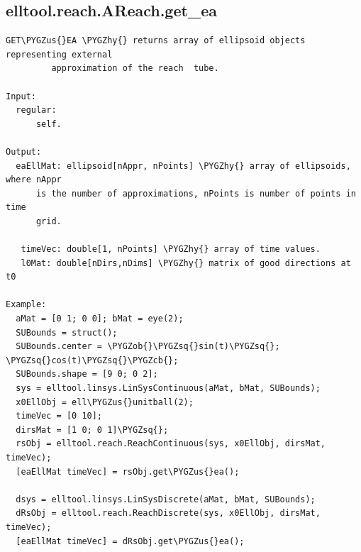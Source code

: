 \documentclass[letterpaper,10pt,english]{sphinxmanual}
\def\PYGZus{\char`\_}
\def\PYGZob{\char`\{}
\def\PYGZcb{\char`\}}
\def\PYGZhy{\char`\-}
\def\PYGZsq{\char`\'}
\begin{document}
\subsection{elltool.reach.AReach.get\_ea}
\label{chap_functions:elltool-reach-areach-get-ea}
\begin{Verbatim}[commandchars=\\\{\}]
GET\PYGZus{}EA \PYGZhy{} returns array of ellipsoid objects representing external
         approximation of the reach  tube.

Input:
  regular:
      self.

Output:
  eaEllMat: ellipsoid[nAppr, nPoints] \PYGZhy{} array of ellipsoids, where nAppr
      is the number of approximations, nPoints is number of points in time
      grid.

   timeVec: double[1, nPoints] \PYGZhy{} array of time values.
   l0Mat: double[nDirs,nDims] \PYGZhy{} matrix of good directions at t0

Example:
  aMat = [0 1; 0 0]; bMat = eye(2);
  SUBounds = struct();
  SUBounds.center = \PYGZob{}\PYGZsq{}sin(t)\PYGZsq{}; \PYGZsq{}cos(t)\PYGZsq{}\PYGZcb{};
  SUBounds.shape = [9 0; 0 2];
  sys = elltool.linsys.LinSysContinuous(aMat, bMat, SUBounds);
  x0EllObj = ell\PYGZus{}unitball(2);
  timeVec = [0 10];
  dirsMat = [1 0; 0 1]\PYGZsq{};
  rsObj = elltool.reach.ReachContinuous(sys, x0EllObj, dirsMat, timeVec);
  [eaEllMat timeVec] = rsObj.get\PYGZus{}ea();

  dsys = elltool.linsys.LinSysDiscrete(aMat, bMat, SUBounds);
  dRsObj = elltool.reach.ReachDiscrete(sys, x0EllObj, dirsMat, timeVec);
  [eaEllMat timeVec] = dRsObj.get\PYGZus{}ea();
\end{Verbatim}
\end{document}
